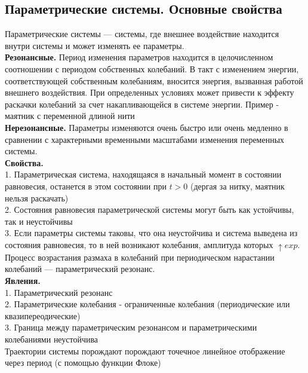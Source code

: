 \begin{multicols*}{2}
		\section{Параметрические системы. Основные свойства}
		Параметрические системы — системы, где внешнее воздействие находится внутри системы и может изменять ее параметры.\\
		\textbf{Резонансные. } Период изменения параметров находится в целочисленном соотношении с периодом собственных колебаний. В такт с изменением энергии, соответствующей собственным колебаниям, вносится энергия, вызванная работой внешнего воздействия. При определенных условиях может привести к эффекту раскачки колебаний за счет накапливающейся в системе энергии. Пример - маятник с переменной длиной нити\\
		\textbf{Нерезонансные. }Параметры изменяются очень быстро или очень медленно в сравнении с характерными временными масштабами изменения переменных системы.\\
		\textbf{Свойства.}\\
		1. Параметрическая система, находящаяся в начальный момент в состоянии равновесия, останется в этом состоянии при $t>0$ (дергая за нитку, маятник нельзя раскачать)\\
		2. Состояния равновесия параметрической системы могут быть как устойчивы, так и неустойчивы\\
		3. Если параметры системы таковы, что она неустойчива и система выведена из состояния равновесия, то в ней возникают колебания, амплитуда которых $\uparrow exp$. Процесс возрастания размаха в колебаний при периодическом нарастании колебаний — параметрический резонанс.\\
		\textbf{Явления.}\\
		1. Параметрический резонанс\\
		2. Параметрические колебания - ограниченные колебания (периодические или квазипереодические)\\
		3. Граница между параметрическим резонансом и параметрическими колебаниями неустойчива\\
		Траектории системы порождают порождают точечное линейное отображение через период (с помощью функции Флоке)
		

\end{multicols*}
